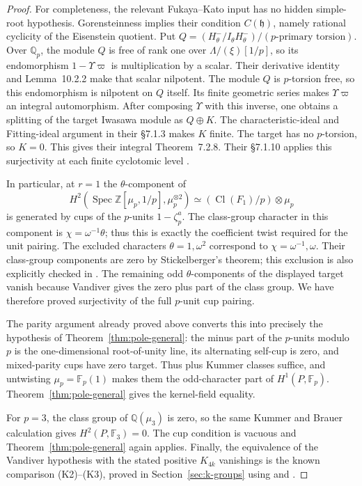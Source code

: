 \documentclass[11pt,a4paper]{article}
\theoremstyle{definition}
\begin{document}
\begin{proof}
For completeness, the relevant Fukaya--Kato input has no hidden
simple-root hypothesis. Gorensteinness implies their condition
$C(\mathfrak h)$, namely rational cyclicity of the Eisenstein quotient.
Put $Q=(H^-_\theta/I_\theta H^-_\theta)/(p\text{-primary torsion})$.
Over $\mathbb Q_p$, the module $Q$ is free of rank one over
$\Lambda/(\xi)[1/p]$, so its endomorphism $1-\Upsilon\varpi$
is multiplication by a scalar. Their derivative identity and
Lemma~10.2.2 make that scalar nilpotent.
The module $Q$ is $p$-torsion free, so this endomorphism is nilpotent
on $Q$ itself. Its finite geometric series makes
$\Upsilon\varpi$ an integral automorphism. After composing $\Upsilon$ with this inverse, one obtains a splitting
of the target Iwasawa module as $Q\oplus K$. The characteristic-ideal
and Fitting-ideal argument in their \S7.1.3 makes $K$ finite.
The target has no $p$-torsion, so $K=0$. This gives their integral
Theorem~7.2.8. Their \S7.1.10 applies this
surjectivity at each finite cyclotomic level
\cite[\S\S7.1.3, 7.1.8--7.1.10, Theorem~7.2.8,
\S\S7.2.10--7.2.12 and~10.2.2--10.2.3;
preprint pp.~84--86, 89 and~107]{FukayaKato2012}.

In particular, at $r=1$ the $\theta$-component of
\[
 H^2(\operatorname{Spec}\mathbb Z[\mu_p,1/p],\mu_p^{\otimes2})
 \simeq (\operatorname{Cl}(F_1)/p)\otimes\mu_p
\]
is generated by cups of the $p$-units $1-\zeta_p^a$.
The class-group character in this component is
$\chi=\omega^{-1}\theta$; thus this is exactly the coefficient twist
required for the unit pairing. The excluded characters
$\theta=1,\omega^2$ correspond to $\chi=\omega^{-1},\omega$.
Their class-group components are zero by Stickelberger's theorem;
this exclusion is also explicitly checked in
\cite[proof of Lemma~5.2.7, p.~13]{WakeWangErickson2017}.
The remaining odd $\theta$-components of the displayed target vanish
because Vandiver gives the zero plus part of the class group.
We have therefore proved surjectivity of the full $p$-unit cup pairing.

The parity argument already proved above converts this into precisely
the hypothesis of Theorem~\ref{thm:pole-general}: the minus part of
the $p$-units modulo $p$ is the one-dimensional root-of-unity line,
its alternating self-cup is zero, and mixed-parity cups have zero
target. Thus plus Kummer classes suffice, and untwisting
$\mu_p=\mathbb F_p(1)$ makes them the odd-character part of
$H^1(P,\mathbb F_p)$. Theorem~\ref{thm:pole-general} gives the
kernel-field equality.

For $p=3$, the class group of $\mathbb Q(\mu_3)$ is zero, so the
same Kummer and Brauer calculation gives $H^2(P,\mathbb F_3)=0$.
The cup condition is vacuous and Theorem~\ref{thm:pole-general}
again applies. Finally, the equivalence of the Vandiver hypothesis
with the stated positive $K_{4k}$ vanishings is the known comparison
(K2)--(K3), proved in Section~\ref{sec:k-groups} using
\cite[VI.8.2, VI.8.3 and VI.10.9]{Weibel2013} and
\cite[Corollary~1.5, Proposition~3.7 and Remark~3.11]{Kurihara1992}.
\end{proof}
\end{document}
